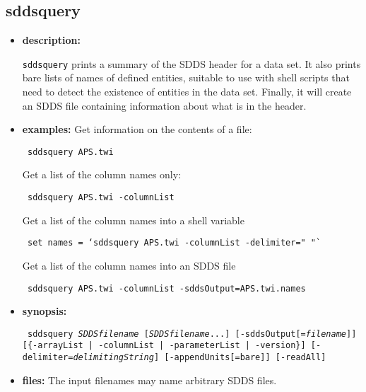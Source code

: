 \newpage
\subsection{sddsquery}
\label{sddsquery}

\begin{itemize}
\item {\bf description:}

\verb|sddsquery| prints a summary of the SDDS header for a data set.  It also prints 
bare lists of names of defined entities, suitable to use with shell
scripts that need to detect the existence of entities in the data set.
Finally, it will create an SDDS file containing information about what is in the
header.

\item {\bf examples:} 
Get information on the contents of a file:
\begin{flushleft}{\tt
sddsquery APS.twi
}\end{flushleft}
Get a list of the column names only:
\begin{flushleft}{\tt
sddsquery APS.twi -columnList
}\end{flushleft}
Get a list of the column names into a shell variable
\begin{flushleft}{\tt
set names = `sddsquery APS.twi -columnList -delimiter=" "`
}\end{flushleft}
Get a list of the column names into an SDDS file
\begin{flushleft}{\tt
sddsquery APS.twi -columnList -sddsOutput=APS.twi.names
}\end{flushleft}

\item {\bf synopsis:} 
\begin{flushleft}{\tt
sddsquery {\em SDDSfilename} [{\em SDDSfilename}...] 
[-sddsOutput[={\em filename}]]
[\{-arrayList | -columnList | -parameterList | -version\}]
[-delimiter={\em delimitingString}] [-appendUnits[=bare]] [-readAll]
}\end{flushleft}

\item {\bf files:} 
The input filenames may name arbitrary SDDS files.  


\end{itemize}
